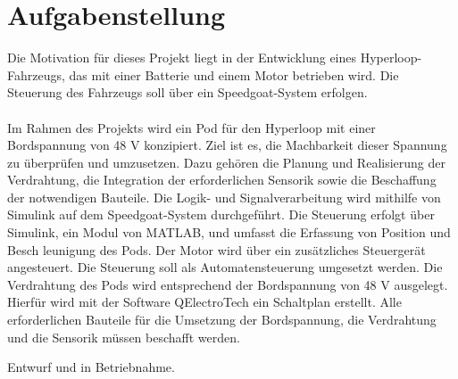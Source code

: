 

\section{Aufgabenstellung}
Die Motivation für dieses Projekt liegt in der Entwicklung eines Hyperloop-Fahrzeugs, das mit einer Batterie und einem Motor betrieben wird. Die Steuerung des Fahrzeugs soll über ein Speedgoat-System erfolgen.\\ \ \\
Im Rahmen des Projekts wird ein Pod für den Hyperloop mit einer Bordspannung von 48 V konzipiert. Ziel ist es, die Machbarkeit dieser Spannung zu überprüfen und umzusetzen. Dazu gehören die Planung und Realisierung der Verdrahtung, die Integration der erforderlichen Sensorik sowie die Beschaffung der notwendigen Bauteile. Die Logik- und Signalverarbeitung wird mithilfe von Simulink auf dem Speedgoat-System durchgeführt.
Die Steuerung erfolgt über Simulink, ein Modul von MATLAB, und umfasst die Erfassung von Position und Besch leunigung des Pods. Der Motor wird über ein zusätzliches Steuergerät angesteuert. Die Steuerung soll als Automatensteuerung umgesetzt werden.
Die Verdrahtung des Pods wird entsprechend der Bordspannung von 48 V ausgelegt. Hierfür wird mit der Software QElectroTech ein Schaltplan erstellt.
Alle erforderlichen Bauteile für die Umsetzung der Bordspannung, die Verdrahtung und die Sensorik müssen beschafft werden.


Entwurf und in Betriebnahme.


\pagebreak

